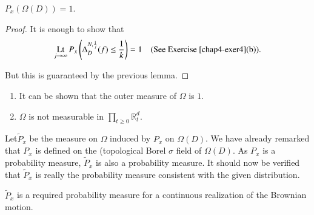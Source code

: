 \begin{theorem*}
$P_{x}(\Omega(D))=1$.
\end{theorem*}

\begin{proof}
It is enough to show that
$$
\operatorname*{Lt}\limits_{j\to \infty}P_{x}\left(\Delta^{N,\frac{1}{j}}_{D}(f)\leq
\frac{1}{k}\right)=1\quad\text{(See Exercise \ref{chap4-exer4}(b)).}
$$

But this is guaranteed by the previous lemma.
\end{proof}

\begin{remark*}
\begin{enumerate}
\item It can be shown that the outer measure of $\Omega$ is $1$.

\item $\Omega$ is not measurable in $\prod\limits_{t\geq
  0}\mathbb{R}^{d}_{t}$. 
\end{enumerate}
\end{remark*}


Let\pageoriginale $\tilde{P}_{x}$ be the measure on $\Omega$ induced
by $P_{x}$ on $\Omega(D)$. We have already remarked that $P_{x}$ is
defined on the (topological Borel $\sigma$ field of $\Omega(D)$. As
$P_{x}$ is a probability measure, $\tilde{P}_{x}$ is also a
probability measure. It should now be verified that $\tilde{P}_{x}$ is
really the probability measure consistent with the given distribution.

\begin{theorem*}
$\tilde{P}_{x}$ is a required probability measure for a continuous
  realization of the Brownian motion.
\end{theorem*}

